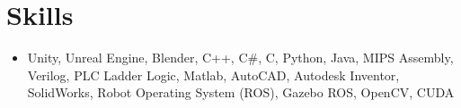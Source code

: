 \documentclass[letterpaper,11pt]{article}
\newcommand{\resumeItem}[1]{
  \item\small{
    {#1 \vspace{-2pt}}
  }
}
\newcommand{\resumeSkillSimple}[1]{
  \item \small{#1}
}
\newcommand{\resumeItemListEnd}{\end{itemize}\vspace{-5pt}}
\begin{document}
     
        
 

    
    
  
 
%

\section{Skills}
\begin{itemize}[leftmargin=0.15in, label={}]
  \resumeSkillSimple{Unity, Unreal Engine, Blender, C++, C\#, C, Python, Java, MIPS Assembly, Verilog, PLC Ladder Logic, Matlab, AutoCAD, Autodesk Inventor, SolidWorks, Robot Operating System (ROS), Gazebo ROS, OpenCV, CUDA}
\end{itemize}
\vspace{-20pt}
\end{document}
